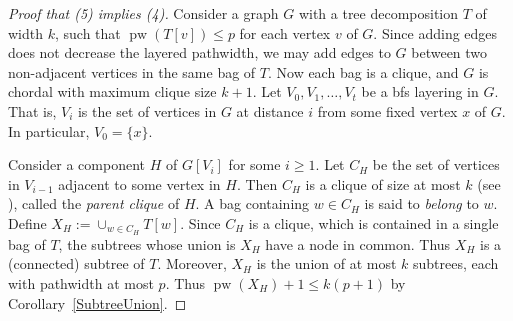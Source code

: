 \documentclass[a4paper,11pt]{article}
\DeclareMathOperator{\pw}{pw}
\theoremstyle{plain}
\theoremstyle{definition}
\begin{document}
\begin{proof}[Proof that (5) implies (4)] Consider a graph  $G$ with a tree decomposition $T$ of width $k$, such that $\pw(T[v])\leq p$  for each vertex $v$ of $G$. Since adding edges does not decrease the layered pathwidth, we may add edges to $G$ between two non-adjacent vertices in the same bag of $T$. Now each bag is a clique, and $G$ is chordal with maximum clique size $k+1$. Let $V_0,V_1,\dots,V_t$ be a bfs layering in $G$. That is, $V_i$ is the set of vertices in $G$ at distance $i$ from some fixed vertex $x$ of $G$. In particular, $V_0=\{x\}$. 

Consider a component $H$ of $G[V_i]$ for some $i\geq 1$. Let $C_H$ be the set of vertices in $V_{i-1}$ adjacent to some vertex in $H$. Then $C_H$ is a clique of size at most $k$ (see \citep{KP-DM08,DMW05}), called the \emph{parent clique} of $H$. A bag containing $w\in C_H$ is said to \emph{belong} to $w$. Define $X_H:=\cup_{w\in C_H}T[w]$. Since $C_H$ is a clique, which is contained in a single bag of $T$, the subtrees whose union is $X_H$ have a node in common. Thus $X_H$ is a (connected) subtree of $T$. Moreover, $X_H$  is the union of at most $k$ subtrees, each with pathwidth at most $p$. Thus $\pw(X_H)+1\leq k(p+1)$ by Corollary~\ref{SubtreeUnion}. 


\end{proof}
\end{document}
